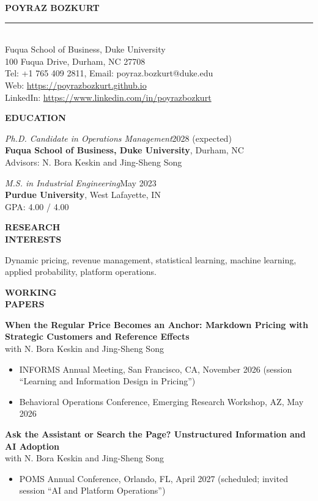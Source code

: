 \documentclass[10pt,letterpaper]{article}
\newlength{\labelw}\setlength{\labelw}{1.35in}
\newlength{\gapw}\setlength{\gapw}{0.1in}
\newlength{\bodyw}\setlength{\bodyw}{\dimexpr\textwidth-\labelw-\gapw\relax}
\newcommand{\cvsection}[2]{%
  \par\vspace{16pt}%
  \noindent\begin{minipage}[t]{\labelw}\raggedright\textbf{#1}\end{minipage}%
  \hspace{\gapw}%
  \begin{minipage}[t]{\bodyw}#2\end{minipage}\par}
\newcommand{\entry}[2]{{\itshape #1}\hfill #2}
\newcommand{\entrygap}{\par\vspace{12pt}}
\begin{document}
\begin{center}
{\large\bfseries POYRAZ BOZKURT}\\[4pt]
\rule{\textwidth}{0.5pt}\\[8pt]
Fuqua School of Business, Duke University\\
100 Fuqua Drive, Durham, NC 27708\\
Tel: +1 765 409 2811, Email: poyraz.bozkurt@duke.edu\\
Web: \url{https://poyrazbozkurt.github.io}\\
LinkedIn: \url{https://www.linkedin.com/in/poyrazbozkurt}
\end{center}

\vspace{6pt}

\cvsection{EDUCATION}{%
\entry{Ph.D. Candidate in Operations Management}{2028 (expected)}\\
\textbf{Fuqua School of Business, Duke University}, Durham, NC\\
Advisors: N. Bora Keskin and Jing-Sheng Song
\entrygap
\entry{M.S. in Industrial Engineering}{May 2023}\\
\textbf{Purdue University}, West Lafayette, IN\\
GPA: 4.00 / 4.00
}

\cvsection{RESEARCH\\INTERESTS}{%
Dynamic pricing, revenue management, statistical learning, machine learning, applied probability, platform operations.
}

\cvsection{WORKING\\PAPERS}{%
\textbf{When the Regular Price Becomes an Anchor: Markdown Pricing with Strategic Customers and Reference Effects}\\
with N. Bora Keskin and Jing-Sheng Song
\begin{itemize}
  \item INFORMS Annual Meeting, San Francisco, CA, November 2026 (session ``Learning and Information Design in Pricing'')
  \item Behavioral Operations Conference, Emerging Research Workshop, AZ, May 2026
\end{itemize}
\vspace{6pt}
\textbf{Ask the Assistant or Search the Page? Unstructured Information and AI Adoption}\\
with N. Bora Keskin and Jing-Sheng Song
\begin{itemize}
  \item POMS Annual Conference, Orlando, FL, April 2027 (scheduled; invited session ``AI and Platform Operations'')
\end{itemize}
}
\end{document}
